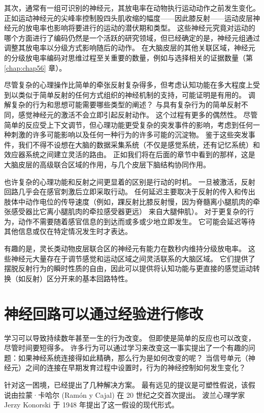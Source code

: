 其次，通常有一组可识别的神经元，其放电率在动物执行运动动作之前发生变化。 
正如运动神经元的尖峰率控制股四头肌收缩的幅度——因此膝反射——运动皮层神经元的放电率也影响将要进行的运动的潜伏期和类型。 
这些神经元究竟对运动的哪个方面进行了编码仍然是一个活跃的研究领域，但已经确定的是，神经元组通过调整其放电率以分级方式影响随后的动作。 
在大脑皮层的其他关联区域，神经元的分级放电率编码对思维过程至关重要的数量，例如与选择相关的证据数量（第 \ref{chap:chap56} 章）。


尽管复杂的心理操作比简单的牵张反射复杂得多，但考虑认知功能在多大程度上受到以类似于简单反射的任何方式组织的神经机制的支持，可能证明是有用的。 
调解复杂的行为和思想可能需要哪些类型的阐述？ 
与具有复杂行为的简单反射不同，感觉神经元的激活不会立即引起反射动作。 
这个过程有更多的偶然性。 
尽管简单的反应受上下文调节，但心理功能更受复杂的突发事件的影响，考虑到任何一种刺激的许多可能影响以及任何一种行为的许多可能的沉淀物。 
鉴于这些突发事件，我们不得不设想在大脑的数据采集系统（不仅是感觉系统，还有记忆系统）和效应器系统之间建立灵活的路由。 
正如我们将在后面的章节中看到的那样，这是大脑皮层的高级联合区域的作用，与几个皮层下脑结构协同作用。


也许复杂的心理功能和反射之间更显着的区别是行动的时机。 
一旦被激活，反射回路几乎会在感官刺激后立即采取行动。 
任何延迟主要取决于反射的传入和传出肢体中动作电位的传导速度（例如，踝反射比膝反射慢，因为脊髓离小腿肌肉的牵张感受器比它离小腿肌肉的牵拉感受器更远） 来自大腿伸肌）。 
对于更复杂的行为，动作不需要随着感官信息的到达而或多或少地立即发生。 它可能会延迟等待其他信息或仅在特定情况发生时才表达。


有趣的是，灵长类动物皮层联合区的神经元有能力在数秒内维持分级放电率。 
这些神经元大量存在于调节感觉和运动区域之间灵活联系的大脑区域。 
它们提供了摆脱反射行为的瞬时性质的自由，因此可以提供将认知功能与更直接的感觉运动转换（如反射）区分开来的基本回路特性。


\section{神经回路可以通过经验进行修改}
学习可以导致持续数年甚至一生的行为改变。 
但即使是简单的反应也可以改变，尽管时间要短得多。 
许多行为可以通过学习来改变这一事实提出了一个有趣的问题：如果神经系统连接得如此精确，那么行为是如何改变的呢？ 
当信号单元（神经元）之间的连接在早期发育过程中设置时，行为的神经控制如何发生变化？


针对这一困境，已经提出了几种解决方案。 
最有远见的提议是可塑性假说，该假说由拉蒙·卡哈尔 (Ramón y Cajal) 在 20 世纪之交首次提出。 
波兰心理学家 Jerzy Konorski 于 1948 年提出了这一假设的现代形式。


